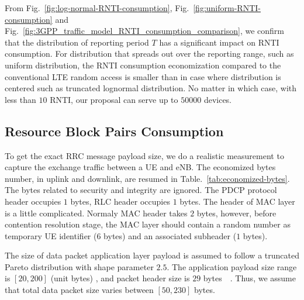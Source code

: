 
From Fig.~\ref{fig:log-normal-RNTI-consumption}, Fig.~\ref{fig:uniform-RNTI-consumption} and Fig.~\ref{fig:3GPP_traffic_model_RNTI_consumption_comparison}, we confirm that the distribution of reporting period $T$ has a significant impact on RNTI consumption. For distribution that spreads out over the reporting range, such as uniform distribution, the RNTI consumption economization compared to the conventional LTE random access is smaller than in case where distribution is centered such as truncated lognormal distribution. No matter in which case, with less than $10$ RNTI, our proposal can serve up to $50000$ devices.

\subsection{Resource Block Pairs Consumption}
To get the exact RRC message payload size, we do a realistic measurement to capture the exchange traffic between a UE and eNB. The economized bytes number, in uplink and downlink, are resumed in Table.~\ref{tab:economized-bytes}. The bytes related to security and integrity are ignored. The PDCP protocol header occupies $1$ bytes, RLC header occupies $1$ bytes. The header of MAC layer is a little complicated. Normaly MAC header takes $2$ bytes, however, before contention resolution stage, the MAC layer should contain a random number as temporary UE identifier ($6$ bytes) and an associated subheader ($1$ bytes).

The size of data packet application layer payload is assumed to follow a truncated Pareto distribution with shape parameter $2.5$. The application payload size  range is $\left[ 20, 200\right] $ (unit bytes) , and packet header size is $29$ bytes~~\cite[Annex E]{3GPP/cellularIoT}. Thus, we assume that total data packet size varies between $\left[ 50, 230 \right] $ bytes.

